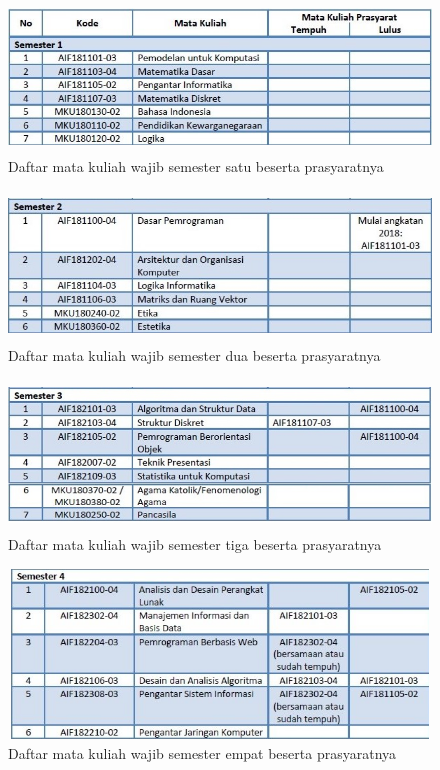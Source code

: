 \begin{figure}[H]
    \centering
    \includegraphics[width=12cm, height=4cm]{Gambar/Prasyarat MK Wajib Sem 1.jpg}
    \caption{Daftar mata kuliah wajib semester satu beserta prasyaratnya}
    \label{fig:gambarSem1}
\end{figure}

\begin{figure}[H]
    \centering
    \includegraphics[width=12cm, height=4cm]{Gambar/Prasyarat MK Wajib Sem 2.jpg}
    \caption{Daftar mata kuliah wajib semester dua beserta prasyaratnya}
    \label{fig:gambarSem2}
\end{figure}

\begin{figure}[H]
    \centering
    \includegraphics[width=12cm, height=4cm]{Gambar/Prasyarat MK Wajib Sem 3.jpg}
    \caption{Daftar mata kuliah wajib semester tiga beserta prasyaratnya}
    \label{fig:gambarSem3}
\end{figure}

\begin{figure}[H]
    \centering
    \includegraphics[width=12cm, height=4.5cm]{Gambar/Prasyarat MK Wajib Sem 4.jpg}
    \caption{Daftar mata kuliah wajib semester empat beserta prasyaratnya}
    \label{fig:gambarSem4}
\end{figure}

